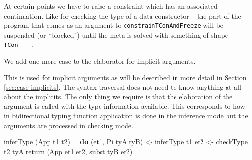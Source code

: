 \documentclass[
  sigconf,
  screen,
  review]{acmart}
\newenvironment{Shaded}{}{}
\newcommand{\DataTypeTok}[1]{\textcolor[rgb]{0.56,0.13,0.00}{#1}}
\newcommand{\FunctionTok}[1]{\textcolor[rgb]{0.02,0.16,0.49}{#1}}
\newcommand{\KeywordTok}[1]{\textcolor[rgb]{0.00,0.44,0.13}{\textbf{#1}}}
\newcommand{\NormalTok}[1]{#1}
\newcommand{\OperatorTok}[1]{\textcolor[rgb]{0.40,0.40,0.40}{#1}}
\newcommand{\OtherTok}[1]{\textcolor[rgb]{0.00,0.44,0.13}{#1}}
\newcommand{\StringTok}[1]{\textcolor[rgb]{0.25,0.44,0.63}{#1}}
\begin{document}
At certain points we have to raise a constraint which has an associated
continuation. Like for checking the type of a data constructor -- the
part of the program that comes as an argument to
\texttt{constrainTConAndFreeze} will be suspended (or ``blocked'') until
the meta is solved with something of shape \texttt{TCon\ \_\ \_}.

\begin{Shaded}
\end{Shaded}

We add one more case to the elaborator for implicit arguments.

\begin{Shaded}
\end{Shaded}

This is used for implicit arguments as will be described in more detail
in Section \ref{sec:case-implicits}. The syntax traversal does not need
to know anything at all about the implicits. The only thing we require
is that the elaboration of the argument is called with the type
information available. This corresponds to how in bidirectional typing
function application is done in the inference mode but the arguments are
processed in checking mode.

\begin{Shaded}
\begin{Highlighting}[]
\NormalTok{inferType (}\DataTypeTok{App}\NormalTok{ t1 t2) }\OtherTok{=} \KeywordTok{do}
\NormalTok{  (et1, }\DataTypeTok{Pi}\NormalTok{ tyA tyB) }\OtherTok{\textless{}{-}}\NormalTok{ inferType t1}
\NormalTok{  et2 }\OtherTok{\textless{}{-}}\NormalTok{ checkType t2 tyA}
  \FunctionTok{return}\NormalTok{ (}\DataTypeTok{App}\NormalTok{ et1 et2, subst tyB et2)}
\end{Highlighting}
\end{Shaded}
\end{document}
